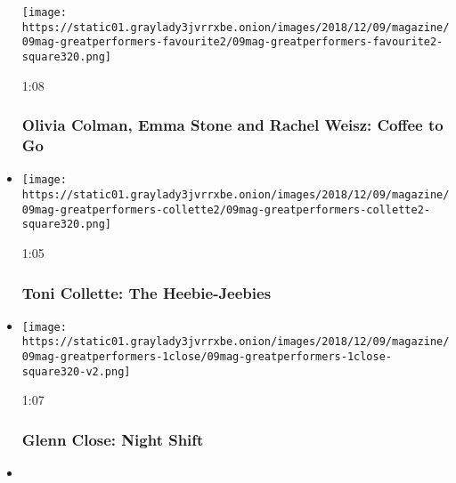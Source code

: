 \begin{itemize}
  \texttt{[image: https://static01.graylady3jvrrxbe.onion/images/2018/12/09/magazine/09mag-greatperformers-favourite2/09mag-greatperformers-favourite2-square320.png]}

  1:08

  \hypertarget{olivia-colman-emma-stone-and-rachel-weisz-coffee-to-go}{%
  \subsubsection{Olivia Colman, Emma Stone and Rachel Weisz: Coffee to
  Go}\label{olivia-colman-emma-stone-and-rachel-weisz-coffee-to-go}}
\item
  \href{https://www.nytimes3xbfgragh.onion/video/magazine/100000006246625/toni-collette-the-heebie-jeebies.html?action=click\&module=video-series-bar\&region=header\&pgtype=Article\&playlistId=video/great-performers}{}

  \texttt{[image: https://static01.graylady3jvrrxbe.onion/images/2018/12/09/magazine/09mag-greatperformers-collette2/09mag-greatperformers-collette2-square320.png]}

  1:05

  \hypertarget{toni-collette-the-heebie-jeebies}{%
  \subsubsection{Toni Collette: The
  Heebie-Jeebies}\label{toni-collette-the-heebie-jeebies}}
\item
  \href{https://www.nytimes3xbfgragh.onion/video/magazine/100000006246513/glenn-close-night-shift.html?action=click\&module=video-series-bar\&region=header\&pgtype=Article\&playlistId=video/great-performers}{}

  \texttt{[image: https://static01.graylady3jvrrxbe.onion/images/2018/12/09/magazine/09mag-greatperformers-1close/09mag-greatperformers-1close-square320-v2.png]}

  1:07

  \hypertarget{glenn-close-night-shift}{%
  \subsubsection{Glenn Close: Night
  Shift}\label{glenn-close-night-shift}}
\item
  \href{https://www.nytimes3xbfgragh.onion/video/magazine/100000006246384/yalitza-aparicio-the-daisy.html?action=click\&module=video-series-bar\&region=header\&pgtype=Article\&playlistId=video/great-performers}{}


\end{itemize}
